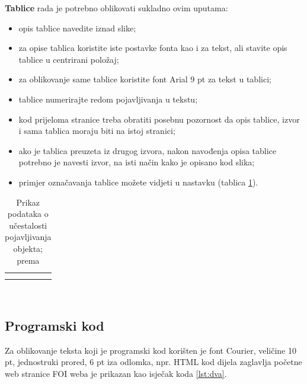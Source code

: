 \documentclass[]{foi}
\begin{document}
\textbf{Tablice} rada je potrebno oblikovati sukladno ovim uputama:
\begin{itemize}
	\item opis tablice navedite iznad slike;

	\item za opise tablica koristite iste postavke fonta kao i za tekst, ali stavite opis tablice u centrirani položaj;

	\item za oblikovanje same tablice koristite font Arial 9 pt za tekst u tablici;

	\item tablice numerirajte redom pojavljivanja u tekstu;

	\item kod prijeloma stranice treba obratiti posebnu pozornost da opis tablice, izvor i sama tablica moraju biti na istoj stranici;

	\item ako je tablica preuzeta iz drugog izvora, nakon navođenja opisa tablice potrebno je navesti izvor, na isti način kako je opisano kod slika;

	\item primjer označavanja tablice možete vidjeti u nastavku (tablica \ref{tab:objekti}).
\end{itemize}

\begin{table}[h!]
	\centering
	\caption{Prikaz podataka o učestalosti pojavljivanja objekta; prema \cite{wooldridge2009IntroductionMultiAgentSystems}}
	\begin{tabularx}{0.66\textwidth}{|X|X|X|X|}
		\hline
		\cellcolor{gray!25} & \cellcolor{gray!25} & \cellcolor{gray!25} & \cellcolor{gray!25} \\
		\hline
		                    &                     &                     &                     \\
		\hline
		                    &                     &                     &                     \\
		\hline
	\end{tabularx}
	\\[10pt]
	\label{tab:objekti}
\end{table}

\subsection{Programski kod}

Za oblikovanje teksta koji je programski kod korišten je font Courier, veličine 10 pt, jednostruki prored, 6 pt iza odlomka, npr. HTML kod dijela zaglavlja početne web stranice FOI weba je prikazan kao isječak koda \ref{lst:dva}.
\end{document}
